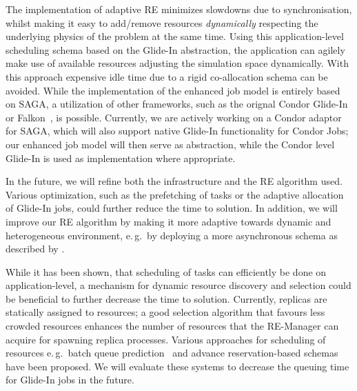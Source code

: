 \documentclass{rspublic}
\newcommand{\alnote}[1]{ {\textcolor{blue} { ***AL: #1 }}}
\newcommand{\alnote}[1]{}
\newcommand{\glidein}[1]{Glide-In }
\begin{document}
{The implementation of adaptive RE minimizes slowdowns due to synchronisation, 
whilst making it easy to add/remove resources {\it dynamically} respecting the
underlying phys\-ics of the problem at the same time. 
Using this application-level scheduling schema based on the Glide-In abstraction,
the application can agilely make use of available resources adjusting
the simulation space dynamically. With this approach expensive idle 
time due to a rigid co-allocation schema can be avoided. 
While the implementation of the enhanced job model is entirely based
on SAGA, a utilization of other frameworks, such as the orignal Condor
Glide-In~\citep{citeulike:291860} or Falkon~\citep{1362680}, is
possible. Currently, we are actively working on a Condor adaptor for
SAGA, which will also support native Glide-In functionality for Condor
Jobs; our enhanced job model will then serve as abstraction, while the
Condor level Glide-In is used as implementation where appropriate.

   
In the future, we will refine both the infrastructure and the RE algorithm
used. Various optimization, such as the prefetching of tasks or the 
adaptive allocation of Glide-In jobs, could further reduce the time
to solution. In addition, we will improve our RE algorithm by making it
more adaptive towards dynamic and heterogeneous environment, 
e.\,g.\ by deploying  a more asynchronous schema
as described by \citet{Gallicchio:2007yq}.


While it has been shown, that scheduling of tasks can efficiently be done on 
application-level, a mechanism for dynamic resource discovery and selection 
could be beneficial to further decrease the time to solution. Currently, replicas are 
statically assigned to resources; a good selection algorithm that favours
less crowded resources enhances the number of resources that the RE-Manager
can acquire for spawning replica processes. Various approaches for 
scheduling of resources  e.\,g.\ batch queue 
prediction~\citep{1254939,Chakraborty:2008nx} and advance reservation-based 
schemas~\citep{Jeske:2007wj} have been proposed. We will evaluate these systems
to decrease the queuing time for Glide-In jobs in the future.

}
\end{document}
